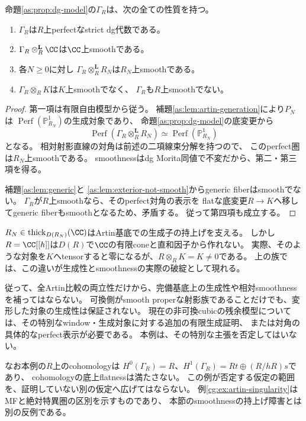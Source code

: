\begin{theorem}[全Artin切断ではsmoothだが完備基底ではsmoothでない族]
\label{as:thm:obstruction}
命題\ref{as:prop:dg-model}の$\Gamma_R$は、次の全ての性質を持つ。
\begin{enumerate}
 \item $\Gamma_R$は$R$上perfectなstrict dg代数である。
 \item $\Gamma_R\otimes_R^{\mathbf L}\CC$は$\CC$上smoothである。
 \item 各$N\ge0$に対し
 $\Gamma_R\otimes_R^{\mathbf L}R_N$は$R_N$上smoothである。
 \item $\Gamma_R\otimes_R K$は$K$上smoothでなく、
 $\Gamma_R$も$R$上smoothでない。
\end{enumerate}
\end{theorem}
\begin{proof}
第一項は有限自由模型から従う。
補題\ref{as:lem:artin-generation}により$P_N$は
$\operatorname{Perf}(\mathbb P^1_{R_N})$の生成対象であり、
命題\ref{as:prop:dg-model}の底変更から
\[
 \operatorname{Perf}(\Gamma_R\otimes_R^{\mathbf L}R_N)
 \simeq\operatorname{Perf}(\mathbb P^1_{R_N})
\]
となる。
相対射影直線の対角は前述の二項線束分解を持つので、
このperfect圏は$R_N$上smoothである。
smoothnessはdg Morita同値で不変だから、第二・第三項を得る。

補題\ref{as:lem:generic}と
\ref{as:lem:exterior-not-smooth}からgeneric fiberはsmoothでない。
$\Gamma_R$が$R$上smoothなら、そのperfect対角の表示を
flatな底変更$R\to K$へ移してgeneric fiberもsmoothとなるため、矛盾する。
従って第四項も成立する。
\end{proof}

\begin{remark}[この反例から分かる研究上の境界]
$R_N\in\operatorname{thick}_{D(R_N)}(\CC)$はArtin基底での生成子の持上げを支える。
しかし$R=\CC[[h]]$は$D(R)$で$\CC$の有限coneと直和因子から作れない。
実際、そのような対象を$K$へtensorすると零になるが、$R\otimes_RK=K\ne0$である。
上の族では、この違いが生成性とsmoothnessの実際の破綻として現れる。

従って、全Artin比較の両立性だけから、完備基底上の生成性や相対smoothnessを補ってはならない。
可換側がsmooth properな射影族であることだけでも、変形した対象の生成性は保証されない。
現在の非可換cubicの残余模型については、その特別なwindow・生成対象に対する追加の有限生成証明、
または対角の具体的なperfect表示が必要である。
本例は、その特別な主張を否定してはいない。

なお本例の$R$上のcohomologyは
$H^0(\Gamma_R)=R$、$H^1(\Gamma_R)=Rt\oplus(R/hR)s$であり、
cohomologyの底上flatnessは満たさない。
この例が否定する仮定の範囲を、証明していない別の仮定へ広げてはならない。
例\ref{cg:ex:artin-singularity}はMFと絶対特異圏の区別を示すものであり、
本節のsmoothnessの持上げ障害とは別の反例である。
\end{remark}

